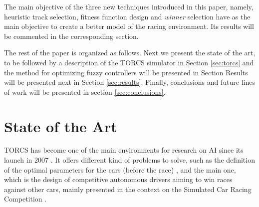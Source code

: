 \documentclass[conference]{IEEEtran}
\begin{document}
The main objective of the three new techniques introduced in this
paper, namely, heuristic track selection, fitness function design and
{\em winner} selection have as the main objective to create a better
model of the racing environment. Its results will be commented in the
corresponding section. 





The rest of the paper is organized as follows. Next we present the
state of the art, to be followed by a description of the TORCS
simulator in Section \ref{sec:torcs} and the
method for optimizing fuzzy controllers will be presented in Section
Results will be presented next in Section \ref{sec:results}. Finally, conclusions and future lines of work will
be presented in section \ref{sec:conclusions}.


\section{State of the Art}
\label{sec:soa}

TORCS has become one of the main environments for research on AI since its launch in 2007 \cite{WebTORCS}. It offers different kind of problems to solve, such as the definition of the optimal parameters for the cars (before the race) \cite{Kole-ParamCarTunning12}, and the main one, which is the design of competitive autonomous drivers aiming to win races against other cars, mainly presented in the context on the Simulated Car Racing Competition \cite{SimulatedCarRacing-2008}.
\end{document}
